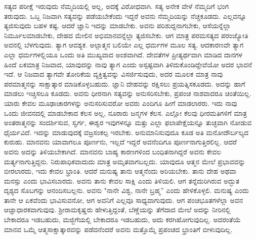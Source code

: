ಸತ್ಯದ ಪರೀಕ್ಷೆ ಇರುವುದು ನೆಮ್ಮದಿಯಲ್ಲಿ ಅಲ್ಲ, ಅದಕ್ಕೆ ವಿರೋಧವಾಗಿ. ಸತ್ಯ ಅನೇಕ ವೇಳೆ ನೆಮ್ಮದಿಗೆ ಭಂಗ ತರುವುದು. ಒಬ್ಬ ನಿಜವಾಗಿ ಸತ್ಯವನ್ನು ಪಡೆಯಬೇಕೆಂದು ಇದ್ದರೆ ಅವನು ನೆಮ್ಮದಿಯನ್ನು ನೆಚ್ಚಕೂಡದು. ಎಲ್ಲವನ್ನೂ ತ್ಯಜಿಸುವುದು ಬಹಳ ಕಷ್ಟ. ಆದರೆ ಜ್ಞಾನಿ ಇದನ್ನು ಮಾಡಬೇಕು. ಅವನು ಪರಿಶುದ್ದನಾಗಬೇಕು, ಆಸೆಯನ್ನೆಲ್ಲಾ ನಿರ್ಮೂಲಮಾಡಬೇಕು, ದೇಹದ ಮೇಲಿನ ಅಭಿಮಾನವನ್ನೆಲ್ಲಾ ತ್ಯಜಿಸಬೇಕು. ಆಗ ಮಾತ್ರ ಪರಮಸತ್ಯದ ಪರಂಜ್ಯೋತಿ ಅವನಲ್ಲಿ ಬೆಳಗುವುದು. ತ್ಯಾಗ ಆವಶ್ಯಕ. ಅಲ್ಪಾತ್ಮನ ಬಲಿಯೇ ಎಲ್ಲ ಧರ್ಮಗಳ ಮೂಲ ಸತ್ಯ. ಆದಕಾರಣವೇ ತ್ಯಾಗ ಎಲ್ಲಾ ಧರ್ಮಗಳಲ್ಲಿಯೂ ಒಂದು ಅತಿ ಮುಖ್ಯವಾದ ಅಂಶವಾಗಿದೆ. ದೇವತೆಗಳ ಪ್ರೀತ್ಯರ್ಥವಾಗಿ ಮಾಡಿದ ದಾನಗಳ ಹಿಂದೆ ಏಕಮಾತ್ರ ನಿಜವಾದ, ಯಾವುದನ್ನು ನಾವು ತ್ಯಾಗ ಎಂದು ಅಸ್ಪಷ್ಟವಾಗಿ ತಿಳಿದುಕೊಂಡಿದ್ದೇವೆಯೋ ಅದರ ಭಾವನೆ ಇದೆ. ಆ ನಿಜವಾದ ತ್ಯಾಗವೇ ತೋರಿಕೆಯ ವ್ಯಕ್ತಿತ್ವವನ್ನು ವಿಸರ್ಜಿಸುವುದು, ಅದರ ಮೂಲಕ ಮಾತ್ರ ನಾವು ಪರಮಾತ್ಮನನ್ನು ಸಾಕ್ಷಾತ್ಕಾರ ಮಾಡಿಕೊಳ್ಳಬಹುದು. ಜ್ಞಾನಿ ದೇಹವನ್ನು ರಕ್ಷಿಸಲು ಪ್ರಯತ್ನಿಸಕೂಡದು. ಅದನ್ನು ಹಾಗೆ ಮಾಡಲು ಇಚ್ಚಿಸಲೂ ಕೂಡದು. ಅವನು ಧೀರನಾಗಿ ಸತ್ಯವನ್ನು ಅನುಸರಿಸಬೇಕು, ಪ್ರಪಂಚ ನಾಶವಾದರೂ ಚಿಂತೆಯಿಲ್ಲ. ಯಾರು ಕೇವಲ ಮೂಢಾಚಾರಗಳನ್ನು ಅನುಸರಿಸುವರೋ ಅವರು ಎಂದಿಗೂ ಹೀಗೆ ಮಾಡಲಾರರು. ಇದು ನಾವು ಒಂದು ಜೀವನದಲ್ಲಿ ಮಾಡಬೇಕಾದ ಕೆಲಸ ಅಲ್ಲ, ನೂರಾರು ಜನ್ಮಗಳ ಕೆಲಸ. ಎಲ್ಲೋ ಕೆಲವು ಧೀರಮತಿಗಳಿಗೆ ಮಾತ್ರ ಅಂತರಾತ್ಮನನ್ನು ಸಂದರ್ಶಿಸುವ, ಸ್ವರ್ಗ, ಈಶ್ವರ ಇವುಗಳನ್ನೂ ಮತ್ತು ಎಲ್ಲಾ ಫಲಾಪೇಕ್ಷೆಯನ್ನೂ ತುಚ್ಛವಾಗಿ ನೋಡುವ ಧೈರ್ಯವಿದೆ. ಇದನ್ನು ಮಾಡುವುದಕ್ಕೆ ವಜ್ರಸಂಕಲ್ಪ ಇರಬೇಕು. ಅನುಮಾನಿಸುವುದೂ ಕೂಡ ಅತಿ ಮನೋದೌರ್ಬಲ್ಯದ ಕುರುಹು. ಮಾನವನು ಯಾವಾಗಲೂ ಪೂರ್ಣನು, ಇಲ್ಲದೆ ಇದ್ದರೆ ಅವನೆಂದಿಗೂ ಪೂರ್ಣನಾಗುತ್ತಿರಲಿಲ್ಲ. ಆದರೆ ಅವನು ಅದನ್ನು ತಿಳಿಯಬೇಕಾಗಿದೆ. ಮಾನವನು ಬಾಹ್ಯ ಕಾರಣಗಳಿಂದ ಬಂಧಿತನಾಗಿದ್ದರೆ ಅವನು ಕೇವಲ ಮರ್ತ್ಯನಾಗುತ್ತಿದ್ದನು. ನಿರುಪಾಧಿಕವಾದುದು ಮಾತ್ರ ಅಮೃತವಾಗಬಲ್ಲದು. ಯಾವುದೂ ಆತ್ಮನ ಮೇಲೆ ಪ್ರಭಾವವನ್ನು ಬೀರಲಾರದು, ಇದು ಕೇವಲ ಭ್ರಾಂತಿ. ಆದರೆ ಮನುಷ್ಯ ತಾನು ಆತ್ಮನೆಂದು ಅರಿಯಬೇಕು. ತಾನು ದೇಹ ಅಥವಾ ಮನಸ್ಸು ಎಂದು ಭಾವಿಸಬಾರದು. ಅವನು ತಾನು ಕೇವಲ ಸಾಕ್ಷಿ ಎಂದು ತಿಳಿಯಲಿ. ಆಗ ತನ್ನೆದುರಿಗಿರುವ ಅದ್ಭುತ ದೃಶ್ಯದ ಸೊಬಗನ್ನು ಆನಂದಿಸಬಲ್ಲನು. ಅವನು "ನಾನೇ ವಿಶ್ವ, ನಾನೇ ಬ್ರಹ್ಮ'' ಎಂದು ಹೇಳಿಕೊಳ್ಳಲಿ. ಮನುಷ್ಯ ಎಂದು ತಾನೇ ಆ ಏಕವೆಂದು ಭಾವಿಸುವನೋ, ಆಗ ಅವನಿಗೆ ಎಲ್ಲವೂ ಸಾಧ್ಯವಾಗುವುದು. ಆಗ ಪಂಚಭೂತಗಳೆಲ್ಲಾ ಅವನ ಆಜ್ಞಾಧಾರಕವಾಗುವುವು. ಶ‍್ರೀರಾಮಕೃಷ್ಣರು ಹೇಳುತ್ತಿದ್ದಂತೆ, ಬೆಣ್ಣೆಯನ್ನು ತೆಗೆದಾದ ಮೇಲೆ ಅದನ್ನು ನೀರಿನಲ್ಲಿ ಬೇಕಾದರೂ ಇಡಬಹುದು, ಮಜ್ಜಿಗೆಯಲ್ಲಿ ಬೇಕಾದರೂ ಇಡಬಹುದು, ಅದು ಕರಗಿಹೋಗುವುದಿಲ್ಲ. ಅದರಂತೆಯೆ ಮಾನವ ಒಮ್ಮೆ ಆತ್ಮಸಾಕ್ಷಾತ್ಕಾರವನ್ನು ಪಡೆದನೆಂದರೆ ಅವನು ಮತ್ತೊಮ್ಮೆ ಪ್ರಪಂಚದ ಭ್ರಾಂತಿಗೆ ಬೀಳುವುದಿಲ್ಲ.

